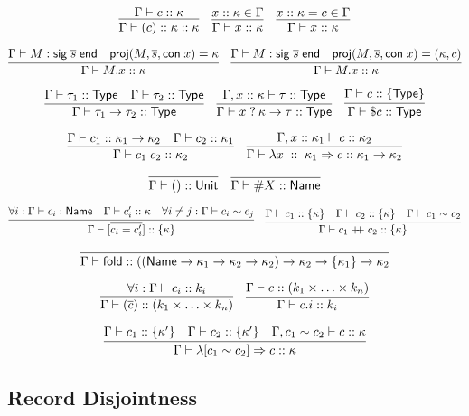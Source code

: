 \documentclass{article}
\newcommand{\mt}[1]{\mathsf{#1}}
\newcommand{\rc}{+ \hspace{-.075in} + \;}
\begin{document}
$$\infer{\Gamma \vdash (c) :: \kappa :: \kappa}{
  \Gamma \vdash c :: \kappa
}
\quad \infer{\Gamma \vdash x :: \kappa}{
  x :: \kappa \in \Gamma
}
\quad \infer{\Gamma \vdash x :: \kappa}{
  x :: \kappa = c \in \Gamma
}$$

$$\infer{\Gamma \vdash M.x :: \kappa}{
  \Gamma \vdash M : \mt{sig} \; \overline{s} \; \mt{end}
  & \mt{proj}(M, \overline{s}, \mt{con} \; x) = \kappa
}
\quad \infer{\Gamma \vdash M.x :: \kappa}{
  \Gamma \vdash M : \mt{sig} \; \overline{s} \; \mt{end}
  & \mt{proj}(M, \overline{s}, \mt{con} \; x) = (\kappa, c)
}$$

$$\infer{\Gamma \vdash \tau_1 \to \tau_2 :: \mt{Type}}{
  \Gamma \vdash \tau_1 :: \mt{Type}
  & \Gamma \vdash \tau_2 :: \mt{Type}
}
\quad \infer{\Gamma \vdash x \; ? \: \kappa \to \tau :: \mt{Type}}{
  \Gamma, x :: \kappa \vdash \tau :: \mt{Type}
}
\quad \infer{\Gamma \vdash \$c :: \mt{Type}}{
  \Gamma \vdash c :: \{\mt{Type}\}
}$$

$$\infer{\Gamma \vdash c_1 \; c_2 :: \kappa_2}{
  \Gamma \vdash c_1 :: \kappa_1 \to \kappa_2
  & \Gamma \vdash c_2 :: \kappa_1
}
\quad \infer{\Gamma \vdash \lambda x \; :: \; \kappa_1 \Rightarrow c :: \kappa_1 \to \kappa_2}{
  \Gamma, x :: \kappa_1 \vdash c :: \kappa_2
}$$

$$\infer{\Gamma \vdash () :: \mt{Unit}}{}
\quad \infer{\Gamma \vdash \#X :: \mt{Name}}{}$$

$$\infer{\Gamma \vdash [\overline{c_i = c'_i}] :: \{\kappa\}}{
  \forall i: \Gamma \vdash c_i : \mt{Name}
  & \Gamma \vdash c'_i :: \kappa
  & \forall i \neq j: \Gamma \vdash c_i \sim c_j
}
\quad \infer{\Gamma \vdash c_1 \rc c_2 :: \{\kappa\}}{
  \Gamma \vdash c_1 :: \{\kappa\}
  & \Gamma \vdash c_2 :: \{\kappa\}
  & \Gamma \vdash c_1 \sim c_2
}$$

$$\infer{\Gamma \vdash \mt{fold} :: ((\mt{Name} \to \kappa_1 \to \kappa_2 \to \kappa_2) \to \kappa_2 \to \{\kappa_1\} \to \kappa_2}{}$$

$$\infer{\Gamma \vdash (\overline c) :: (k_1 \times \ldots \times k_n)}{
  \forall i: \Gamma \vdash c_i :: k_i
}
\quad \infer{\Gamma \vdash c.i :: k_i}{
  \Gamma \vdash c :: (k_1 \times \ldots \times k_n)
}$$

$$\infer{\Gamma \vdash \lambda [c_1 \sim c_2] \Rightarrow c :: \kappa}{
  \Gamma \vdash c_1 :: \{\kappa'\}
  & \Gamma \vdash c_2 :: \{\kappa'\}
  & \Gamma, c_1 \sim c_2 \vdash c :: \kappa
}$$

\subsection{Record Disjointness}
\end{document}
